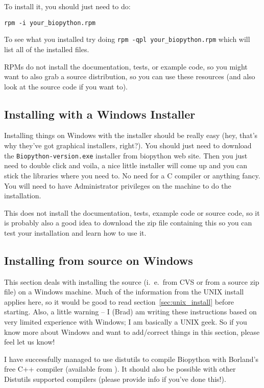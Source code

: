 \documentclass{article}
\begin{document}
To install it, you should just need to do:

\begin{verbatim}
rpm -i your_biopython.rpm
\end{verbatim}

To see what you installed try doing \verb|rpm -qpl your_biopython.rpm| which will list all of the installed files.


RPMs do not install the documentation, tests, or example code, so you might want to also grab a source distribution, so you can use these resources (and also look at the source code if you want to).

\subsection{Installing with a Windows Installer}

Installing things on Windows with the installer should be really easy (hey, that's why they've got graphical installers, right?). You should just need to download the \verb|Biopython-version.exe| installer from biopython web site. Then you just need to double click and voila, a nice little installer will come up and you can stick the libraries where you need to. No need for a C compiler or anything fancy. You will need to have Administrator privileges on the machine to do the installation.


This does not install the documentation, tests, example code or source code, so it is probably also a good idea to download the zip file containing this so you can test your installation and learn how to use it.

\subsection{Installing from source on Windows}
\label{sec:windows_install}

This section deals with installing the source (i.~e.~from CVS or from a source zip file) on a Windows machine. Much of the information from the UNIX install applies here, so it would be good to read section~\ref{sec:unix_install} before starting. Also, a little warning -- I (Brad) am writing these instructions based on very limited experience with Windows; I am basically a UNIX geek. So if you know more about Windows and want to add/correct things in this section, please feel let us know!


I have successfully managed to use distutils to compile Biopython with Borland's free C++ compiler (available from ). It should also be possible with other Distutils supported compilers (please provide info if you've done this!).
\end{document}
